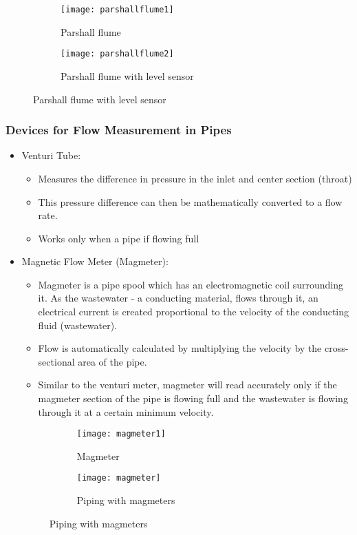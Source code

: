 \begin{figure}[h!]
  \centering
  \begin{subfigure}[b]{0.4\linewidth}
    \texttt{[image: parshallflume1]}
    \caption{Parshall flume}
  \end{subfigure}
  \hspace{1cm}
  \begin{subfigure}[b]{0.4\linewidth}
    \texttt{[image: parshallflume2]}
    \caption{Parshall flume with level sensor}
  \end{subfigure}
\end{figure}
		\subsubsection{Devices for Flow Measurement in Pipes}
					
					\begin{itemize}
						\item Venturi Tube:
							\begin{itemize}
								\item Measures the difference in pressure in the inlet and center section (throat)
								\item This pressure difference can then be mathematically converted to a flow rate.
								\item Works only when a pipe if flowing full
							\end{itemize}
						\item Magnetic Flow Meter (Magmeter):
							\begin{itemize}
								\item Magmeter is a pipe spool which has an electromagnetic coil surrounding it.  As the wastewater - a conducting material, flows through it, an electrical current is created proportional to the velocity of the conducting fluid (wastewater).
								\item Flow is automatically calculated by multiplying the velocity by the cross- sectional area of the pipe.
								\item Similar to the venturi meter, magmeter will read accurately only if the magmeter section of the pipe is flowing full and the wastewater is flowing through it at a certain minimum velocity.
							\end{itemize}
\begin{figure}[h!]
  \centering
  \begin{subfigure}[b]{0.4\linewidth}
    \texttt{[image: magmeter1]}
    \caption{Magmeter}
  \end{subfigure}
  \hspace{1cm}
  \begin{subfigure}[b]{0.45\linewidth}
    \texttt{[image: magmeter]}
    \caption{Piping with magmeters}
  \end{subfigure}
\end{figure} 
					\end{itemize}
